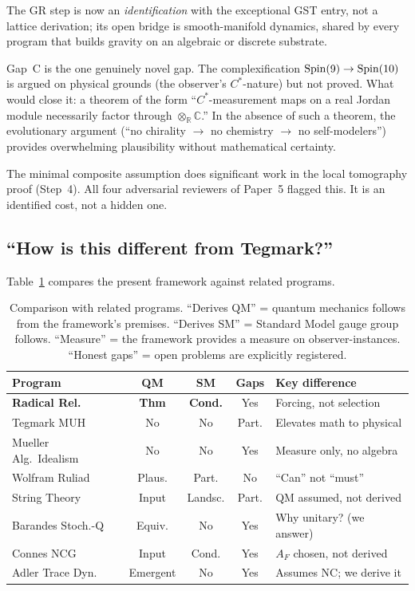 The GR step is now an \emph{identification} with the exceptional GST
entry, not a lattice derivation; its open bridge is smooth-manifold
dynamics, shared by every program that builds gravity on an algebraic
or discrete substrate.

Gap~C is the one genuinely novel gap.  The complexification
$\mathrm{Spin}(9) \to \mathrm{Spin}(10)$ is argued on physical grounds (the
observer's $C^*$-nature) but not proved.  What would close it: a
theorem of the form ``$C^*$-measurement maps on a real Jordan module
necessarily factor through $\otimes_{\mathbb{R}} \mathbb{C}$.''  In
the absence of such a theorem, the evolutionary argument (``no
chirality $\to$ no chemistry $\to$ no self-modelers'') provides
overwhelming plausibility without mathematical certainty.

The minimal composite assumption does significant work in the local
tomography proof (Step~4).  All four adversarial reviewers of Paper~5
flagged this.  It is an identified cost, not a hidden one.

\subsection{``How is this different from Tegmark?''}
\label{subsec:obj-tegmark}

Table~\ref{tab:comparison} compares the present framework against
related programs.

\begin{table}[t]
\centering
\caption{Comparison with related programs.  ``Derives QM'' = quantum
  mechanics follows from the framework's premises.  ``Derives SM'' =
  Standard Model gauge group follows.  ``Measure'' = the framework
  provides a measure on observer-instances.  ``Honest gaps'' = open
  problems are explicitly registered.}
\label{tab:comparison}
\small
\begin{tabular}{@{}p{3.1cm}cccp{2.8cm}@{}}
\toprule
Program & QM & SM & Gaps & Key difference \\
\midrule
\textbf{Radical Rel.} & \textbf{Thm} & \textbf{Cond.}
  & Yes & Forcing, not selection \\
Tegmark MUH & No & No
  & Part. & Elevates math to physical \\
Mueller Alg.\ Idealism & No & No
  & Yes & Measure only, no algebra \\
Wolfram Ruliad & Plaus. & Part.
  & No & ``Can'' not ``must'' \\
String Theory & Input & Landsc.
  & Part. & QM assumed, not derived \\
Barandes Stoch.-Q & Equiv. & No
  & Yes & Why unitary? (we answer) \\
Connes NCG & Input & Cond.
  & Yes & $A_F$ chosen, not derived \\
Adler Trace Dyn. & Emergent & No
  & Yes & Assumes NC; we derive it \\
\bottomrule
\end{tabular}
\end{table}

